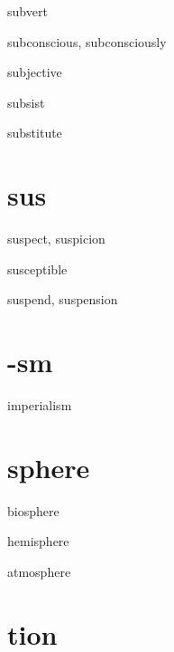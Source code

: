 \begin{RefWord}{subvert}
\end{RefWord}

\begin{RefWord}{subconscious, subconsciously}
\end{RefWord}

\begin{RefWord}{subjective}
\end{RefWord}

\begin{RefWord}{subsist}
\end{RefWord}

\begin{RefWord}{substitute}
\end{RefWord}

\section{sus}

\begin{RefWord}{suspect, suspicion}
\end{RefWord}

\begin{RefWord}{susceptible}
\end{RefWord}

\begin{RefWord}{suspend, suspension}
\end{RefWord}

\section{-sm}

\begin{RefWord}{imperialism}
\end{RefWord}

\section{sphere}
\begin{RefWord}{biosphere}
\end{RefWord}

\begin{RefWord}{hemisphere}
\end{RefWord}

\begin{RefWord}{atmosphere}
\end{RefWord}

\section{tion}

